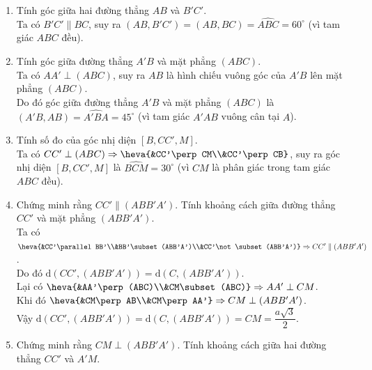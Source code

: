 \begin{bt}
{\begin{center}
		\end{center}
		\begin{enumerate}
			\item Tính góc giữa hai đường thẳng $AB$ và $B'C'$.\\
			Ta có $B'C'\parallel BC$, suy ra $(AB,B'C')=(AB,BC)=\widehat{ABC}=60^\circ$ (vì tam giác $ABC$ đều).
			\item Tính góc giữa đường thẳng $A'B$ và mặt phẳng $(ABC)$.\\
			Ta có $AA'\perp (ABC)$, suy ra $AB$ là hình chiếu vuông góc của $A'B$ lên mặt phẳng $(ABC)$.\\
			Do đó góc giữa đường thẳng $A'B$ và mặt phẳng $(ABC)$ là $(A'B,AB)=\widehat{A'BA}=45^\circ$ (vì tam giác $A'AB$ vuông cân tại $A$).
			\item Tính số đo của góc nhị diện $[B,CC',M]$.\\
			Ta có $CC'\perp (ABC)\Rightarrow \heva{&CC'\perp CM\\&CC'\perp CB}$, suy ra góc nhị diện $[B,CC',M]$ là $\widehat{BCM}=30^\circ$ (vì $CM$ là phân giác trong tam giác $ABC$ đều).
			\item Chứng minh rằng $CC'\parallel (ABB'A')$. Tính khoảng cách giữa đường thẳng $CC'$ và mặt phẳng $(ABB'A')$.\\
			Ta có $\heva{&CC'\parallel BB'\\&BB'\subset (ABB'A')\\&CC'\not\subset (ABB'A')}\Rightarrow CC'\parallel (ABB'A')$.\\ Do đó $\mathrm{d}(CC',(ABB'A'))=\mathrm{d}(C,(ABB'A'))$.\\
			Lại có $\heva{&AA'\perp (ABC)\\&CM\subset (ABC)}\Rightarrow AA'\perp CM$.\\
			Khi đó $\heva{&CM\perp AB\\&CM\perp AA'}\Rightarrow CM\perp (ABB'A')$.\\
			Vậy $\mathrm{d}(CC',(ABB'A'))=\mathrm{d}(C,(ABB'A'))=CM=\dfrac{a\sqrt{3}}{2}$.
			\item Chứng minh rằng $CM\perp (ABB'A')$. Tính khoảng cách giữa hai đường thẳng $CC'$ và $A'M$.\\

\end{enumerate}}
\end{bt}
